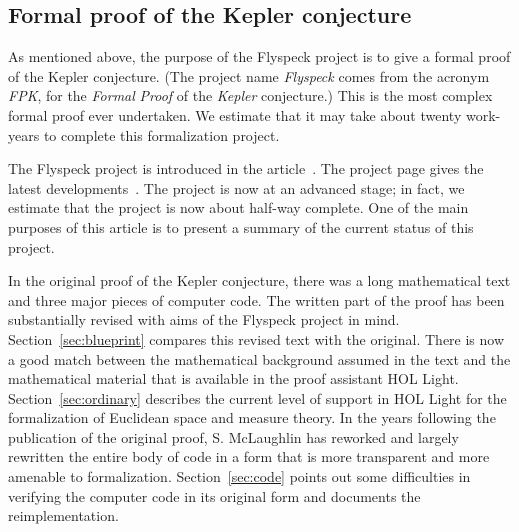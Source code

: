 \documentclass[11pt]{amsart}
\begin{document}
\subsection{Formal proof of the Kepler conjecture}
\label{sec:intro}

As mentioned above, the purpose of the Flyspeck project is to give a formal proof of the Kepler conjecture.  (The project name {\it Flyspeck} comes from the acronym {\it FPK}, for the {\it Formal} {\it Proof} of the {\it Kepler} conjecture.)  This is the most complex formal proof ever undertaken.  We estimate that it may take about twenty work-years to complete this formalization project.  

The Flyspeck project is introduced in the article~\cite{hales:DSP:2006:432}.
The project page gives the latest developments~\cite{website:FlyspeckProject}.
The project is now at an advanced stage; in fact, we estimate that the project is now about half-way complete.  
One of the main purposes of this article is to present a summary of the current status of this project.

In the original proof of the Kepler conjecture, there was a long mathematical text
and  three major pieces of computer code.
The written part of the proof has been substantially revised with aims of the Flyspeck project in mind.   Section~\ref{sec:blueprint} compares this revised text with the original.  There is now a good match between the mathematical background assumed in the text and the mathematical material that is available in the proof assistant HOL Light.  Section~\ref{sec:ordinary} describes the current level of support in HOL Light for the formalization of Euclidean space and measure theory.
 In the years following the publication of the original proof, S. McLaughlin has  reworked and largely rewritten the entire body of code in a form that is more transparent and more amenable to formalization.  Section~\ref{sec:code} points out some difficulties
in verifying the computer code in its original form and
documents the reimplementation.
\end{document}
